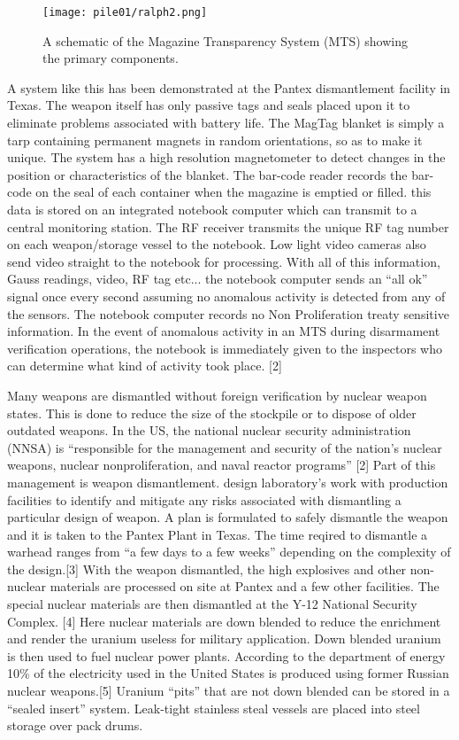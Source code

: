 \documentclass[a4paper]{article}
\begin{document}
\begin{figure}[h!]
  \texttt{[image: pile01/ralph2.png]}
  \caption{A schematic of the Magazine Transparency System (MTS) showing the primary components.}
\end{figure}

A system like this has been demonstrated at the Pantex dismantlement facility in 
Texas. The weapon itself has only passive tags and seals placed upon it to eliminate 
problems associated with battery life. The MagTag blanket is simply a tarp containing 
permanent magnets in random orientations, so as to make it unique. The system has a 
high resolution magnetometer to detect changes in the position or characteristics of 
the blanket. The bar-code reader records the bar-code on the seal of each container 
when the magazine is emptied or filled. this data is stored on an integrated notebook 
computer which can transmit to a central monitoring station. The RF receiver transmits 
the unique RF tag number on each weapon/storage vessel to the notebook. Low light video 
cameras also send video straight to the notebook for processing. With all of this 
information, Gauss readings, video, RF tag etc... the notebook computer sends an ``all 
ok'' signal once every second assuming no anomalous activity is detected from any of the 
sensors. The notebook computer records no Non Proliferation treaty sensitive information. 
In the event of anomalous activity in an MTS during disarmament verification operations, 
the notebook is immediately given to the inspectors who can determine what kind of 
activity took place. [2]

Many weapons are dismantled without foreign verification by nuclear weapon states. 
This is done to reduce the size of the stockpile or to dispose of older outdated weapons. 
In the US, the national nuclear security administration (NNSA) is ``responsible for the 
management and security of the nation’s nuclear weapons, nuclear nonproliferation, and 
naval reactor programs'' [2] Part of this management is weapon dismantlement. design 
laboratory's work with production facilities to identify and mitigate any risks 
associated with dismantling a particular design of weapon. A plan is formulated to 
safely dismantle the weapon and it is taken to the Pantex Plant in Texas. The time 
reqired to dismantle a warhead ranges from ``a few days to a few weeks'' depending on 
the complexity of the design.[3] With the weapon dismantled, the high explosives and 
other non-nuclear materials are processed on site at Pantex and a few other facilities. 
The special nuclear materials are then dismantled at the Y-12 National Security Complex. 
[4] Here nuclear materials are down blended to reduce the enrichment and render the 
uranium useless for military application. Down blended uranium is then used to fuel 
nuclear power plants. According to the department of energy 10\% of the electricity 
used in the United States is produced using former Russian nuclear weapons.[5] Uranium 
``pits'' that are not down blended can be stored in a ``sealed insert'' system. Leak-tight 
stainless steal vessels are placed into steel storage over pack drums.
\end{document}
